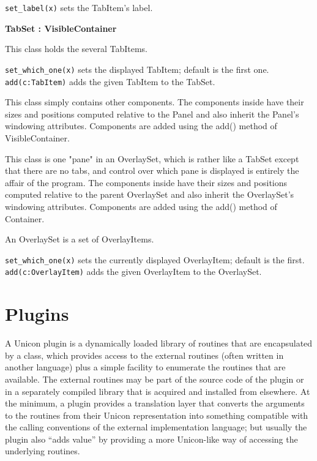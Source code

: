 \texttt{set\_label(x)} sets the TabItem's label.

{\ttfamily\bfseries
{}TabSet : VisibleContainer}

This class holds the several TabItems.

\texttt{set\_which\_one(x)} sets the displayed TabItem;
default is the first one.\\
\texttt{add(c:TabItem)} adds the given TabItem to the TabSet.


This class simply contains other components. The components inside have
their sizes and positions computed relative to the Panel and also
inherit the Panel's windowing attributes. Components
are added using the add() method of VisibleContainer.


This class is one "pane" in an OverlaySet,
which is rather like a TabSet except that there are no tabs, and
control over which pane is displayed is entirely the affair of the
program. The components inside have their sizes and positions computed
relative to the parent OverlaySet and also inherit the
OverlaySet's windowing attributes. Components are
added using the add() method of Container.


An OverlaySet is a set of OverlayItems.

\texttt{set\_which\_one(x)} sets the currently displayed OverlayItem;
default is the first.\\
\texttt{add(c:OverlayItem)} adds the given OverlayItem to the OverlaySet.

\section{Plugins}
A Unicon plugin is a dynamically loaded library of routines that are
encapsulated by a class, which provides access to the external routines (often
written in another language) plus a simple facility to enumerate the routines
that are available. The external routines may be part of the source code of the
plugin or in a separately compiled library that is acquired and installed from
elsewhere. At the minimum, a plugin provides a translation layer that converts
the arguments to the routines from their Unicon representation into something
compatible with the calling conventions of the external implementation language;
but usually the plugin also ``adds value'' by providing a more Unicon-like way
of accessing the underlying routines.

